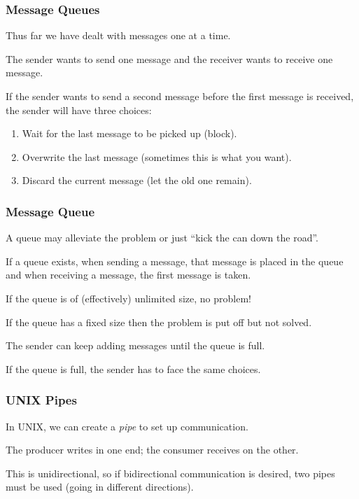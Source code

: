 \begin{frame}
\frametitle{Message Queues}

Thus far we have dealt with messages one at a time.

The sender wants to send one message and the receiver wants to receive one message. 

If the sender wants to send a second message before the first message is received, the sender will have three choices:

\begin{enumerate}
	\item Wait for the last message to be picked up (block).
	\item Overwrite the last message (sometimes this is what you want).
	\item Discard the current message (let the old one remain).
\end{enumerate}


\end{frame}

\begin{frame}
\frametitle{Message Queue}

A queue may alleviate the problem or just ``kick the can down the road''.

  If a queue exists, when sending a message, that message is placed in the queue and when receiving a message, the first message is taken. 
  
 If the queue is of (effectively) unlimited size, no problem!
 
 If the queue has a fixed size then the problem is put off but not solved.
 
 The sender can keep adding messages until the queue is full. 
 
 If the queue is full, the sender has to face the same choices.

\end{frame}

\begin{frame}
\frametitle{UNIX Pipes}

In UNIX, we can create a \textit{pipe} to set up communication. 

The producer writes in one end; the consumer receives on the other. 

This is unidirectional, so if bidirectional communication is desired, two pipes must be used (going in different directions). 

\end{frame}

